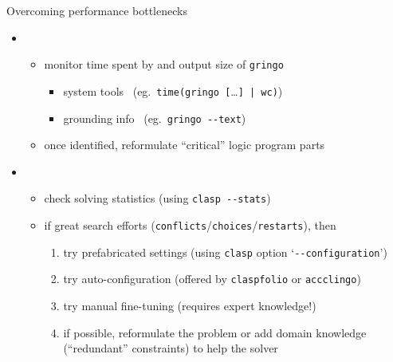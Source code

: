 \begin{frame}{Overcoming performance bottlenecks}
  \begin{itemize}
  \item {}
    \smallskip
    \begin{itemize}
    \item monitor \alert<1-2>{time} spent by and output \alert<1-2>{size} of \lstinline{gringo}
      \begin{itemize}
      \item system tools   \ (eg.\ \lstinline{time(gringo [}\dots{}\lstinline{] | wc)})
      \item grounding info \ (eg.\ \lstinline{gringo --text})
      \end{itemize}
    \item<2-> once identified, \alert<1-2>{reformulate} ``critical'' logic program parts
    \end{itemize}
    \medskip
  \item<3-> 
    \smallskip
    \begin{itemize}
    \item check solving statistics (using \lstinline{clasp --stats})
      \smallskip
    \item<4-> if great search efforts (\lstinline{conflicts}/\lstinline{choices}/\lstinline{restarts}), then
      \smallskip
      \begin{enumerate}
      \item<5-> try prefabricated settings (using \lstinline{clasp} option `\lstinline{--configuration}')
      \item<5-> try auto-configuration (offered by \lstinline{claspfolio} or \lstinline{accclingo})
      \item<5-> try manual fine-tuning (requires expert knowledge!)
      \item<6-> if possible, reformulate the problem or add domain knowledge
        (``redundant'' constraints) to help the solver
      \end{enumerate}
    \end{itemize}
  \end{itemize}
\end{frame}
%
